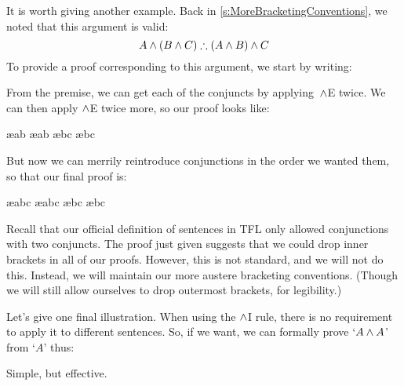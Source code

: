 It is worth giving another example. Back in \cref{s:MoreBracketingConventions}, we noted that this argument is valid:
	$$A \eand (B \eand C) \therefore (A \eand B) \eand C$$
To provide a proof corresponding to this argument, we start by writing:
\begin{fitchproof}
	\PR
\end{fitchproof}
From the premise, we can get each of the conjuncts by applying~$\wedge$E twice. We can then apply $\wedge$E twice more, so our proof looks like:
\begin{fitchproof}
	\PR
	 \ae{ab}
	 \ae{ab}
	 \ae{bc}
	 \ae{bc}
\end{fitchproof}
But now we can merrily reintroduce conjunctions in the order we wanted them, so that our final proof is:
\begin{fitchproof}
	\PR
	 \ae{abc}
	 \ae{abc}
	 \ae{bc}
	 \ae{bc}
\end{fitchproof}
Recall that our official definition of sentences in TFL only allowed conjunctions with two conjuncts. The proof just given suggests that we could drop inner brackets in all of our proofs. However, this is not standard, and we will not do this. Instead, we will maintain our more austere bracketing conventions. (Though we will still allow ourselves to drop outermost brackets, for legibility.)

Let's give one final illustration. When using the $\wedge$I rule, there is no requirement to apply it to different sentences. So, if we want, we can formally prove `$A \wedge A$' from `$A$' thus:
\begin{fitchproof}
	\PR
\end{fitchproof}
Simple, but effective.

